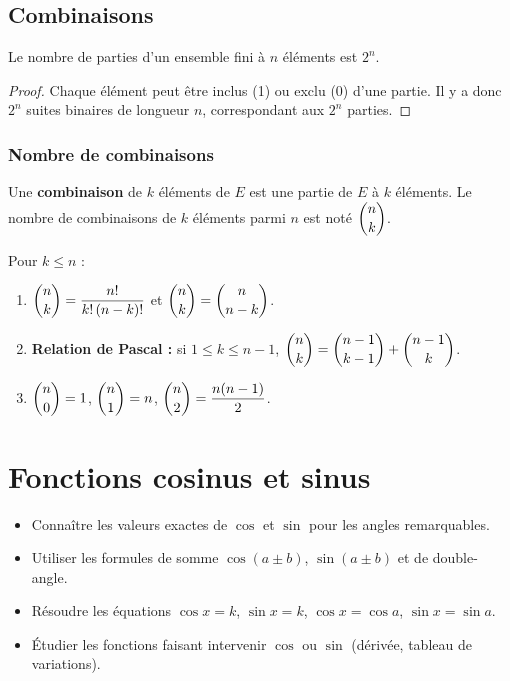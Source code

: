 \documentclass[11pt,a4paper,openany]{book}
\theoremstyle{definition}
\newcommand{\nchap}{
    \setcounter{Définition}{0}
    \setcounter{Propriété}{0}
    \setcounter{Théorème}{0}
    \setcounter{Remarque}{0}
    \setcounter{Exemple}{0}
}
\begin{document}
    \section{Combinaisons}
    \begin{Propriété}
        Le nombre de parties d'un ensemble fini à $n$ éléments est $2^n$.
    \end{Propriété}
    \begin{proof}
        Chaque élément peut être inclus (1) ou exclu (0) d'une partie.
        Il y a donc $2^n$ suites binaires de longueur $n$, correspondant aux $2^n$ parties.
    \end{proof}
    \subsection{Nombre de combinaisons}
    \begin{Définition}
        Une \textbf{combinaison} de $k$ éléments de $E$ est une partie de $E$ à $k$
        éléments. Le nombre de combinaisons de $k$ éléments parmi $n$ est noté
        $\dbinom{n}{k}$.
    \end{Définition}
    \begin{Propriété}
        Pour $k\leq n$ :
        \begin{enumerate}
            \item $\dbinom{n}{k}=\dfrac{n!}{k!\,(n-k)!}$ et $\dbinom{n}{k}=\dbinom{n}{n-k}$.
            \item \textbf{Relation de Pascal :} si $1\leq k\leq n-1$,
                  $\dbinom{n}{k}=\dbinom{n-1}{k-1}+\dbinom{n-1}{k}$.
            \item $\dbinom{n}{0}=1$, $\dbinom{n}{1}=n$,
                  $\dbinom{n}{2}=\dfrac{n(n-1)}{2}$.
        \end{enumerate}
    \end{Propriété}

    \chapter{Fonctions cosinus et sinus}
    \nchap

    \begin{capacitesbox}
    \begin{itemize}
        \item Connaître les valeurs exactes de $\cos$ et $\sin$ pour les angles remarquables.
        \item Utiliser les formules de somme $\cos(a\pm b)$, $\sin(a\pm b)$ et de double-angle.
        \item Résoudre les équations $\cos x=k$, $\sin x=k$, $\cos x=\cos a$, $\sin x=\sin a$.
        \item Étudier les fonctions faisant intervenir $\cos$ ou $\sin$ (dérivée, tableau de variations).
    \end{itemize}
    \end{capacitesbox}
\end{document}
